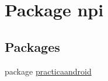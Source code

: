\hypertarget{namespacenpi}{\section{Package npi}
\label{namespacenpi}
}
\subsection*{Packages}
\begin{DoxyCompactItemize}
\item 
package \hyperlink{namespacenpi_1_1practicaandroid}{practicaandroid}
\end{DoxyCompactItemize}
